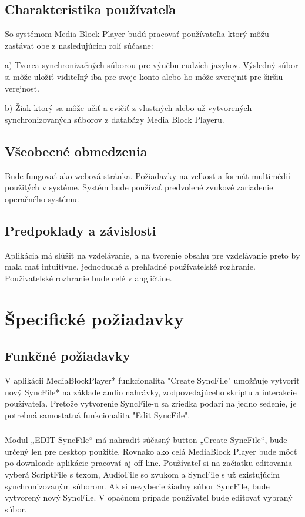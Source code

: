 \documentclass{article}
\begin{document}
\subsection{Charakteristika používateľa }
So systémom Media Block Player budú pracovať používateľia ktorý môžu zastávať obe z nasledujúcich rolí súčasne:

a) Tvorca synchronizačných súborou pre výučbu cudzích jazykov. Výsledný súbor si môže uložiť viditeľný iba pre svoje konto alebo ho môže zverejniť pre širšiu verejnosť.

b) Žiak ktorý sa môže učiť a cvičiť z vlastných alebo už vytvorených synchronizovaných súborov z databázy Media Block Playeru.


\subsection{Všeobecné obmedzenia}
Bude fungovať ako webová stránka. Požiadavky na velkosť a formát multimédií použitých v systéme. Systém bude používať predvolené zvukové zariadenie operačného systému.

\subsection{Predpoklady a závislosti}
Aplikácia má slúžiť na vzdelávanie, a na tvorenie obsahu pre vzdelávanie preto by mala mať intuitívne, jednoduché a prehľadné používateľské rozhranie. Použivateľské rozhranie bude celé v angličtine.



\section{Špecifické požiadavky}

\subsection{Funkčné požiadavky}
V aplikácii MediaBlockPlayer* funkcionalita "Create SyncFile" umožňuje vytvoriť nový SyncFile* na základe audio nahrávky, zodpovedajúceho skriptu a interakcie používateľa. Pretože vytvorenie SyncFile-u sa zriedka podarí na jedno sedenie, je potrebná samostatná funkcionalita "Edit SyncFile". 

\subsubsection{}
Modul „EDIT SyncFile“ má nahradiť súčasný button „Create SyncFile“, bude určený len pre desktop použitie. Rovnako ako celá MediaBlock Player bude môcť po downloade aplikácie pracovať aj off-line. Používateľ si na začiatku editovania vyberá ScriptFile s texom, AudioFile so zvukom a SyncFile s už existujúcim synchronizovaným súborom. Ak si nevyberie žiadny súbor SyncFile, bude vytvorený nový SyncFile. V opačnom prípade používateľ bude editovať vybraný súbor. 
\end{document}
